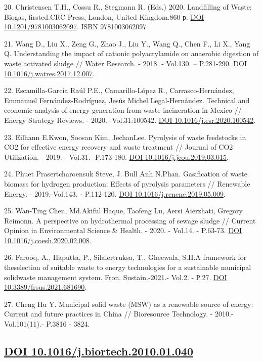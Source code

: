 20. Christensen T.H., Cossu R., Stegmann R. (Eds.) 2020. Landfilling of
Waste: Biogas, firsted.CRC Press, London, United Kingdom.860 р.
\href{https://doi.org/10.1201/9781003062097}{DOI 10.1201/9781003062097}.
ISBN 9781003062097

21. Wang D., Liu X., Zeng G., Zhao J., Liu Y., Wang Q., Chen F., Li X.,
Yang Q. Understanding the impact of cationic polyacrylamide on anaerobic
digestion of waste activated sludge // Water Research. - 2018. -
Vol.130. -- P.281-290.
\href{https://doi.org/10.1016/j.watres.2017.12.007}{DOI
10.1016/j.watres.2017.12.007}.

22. Escamilla-García Raúl P.E., Camarillo-López R., Carrasco-Hernández,
Emmanuel Fernández-Rodríguez, Jesús Michel Legal-Hernández. Technical
and economic analysis of energy generation from waste incineration in
Mexico // Energy Strategy Reviews. - 2020. -Vol.31:100542.
\href{https://doi.org/10.1016/j.esr.2020.100542}{DOI
10.1016/j.esr.2020.100542}.

23. Eilhann E.Kwon, Soosan Kim, JechanLee. Pyrolysis of waste feedstocks
in CO2 for effective energy recovery and waste treatment // Journal of
CO2 Utilization. - 2019. - Vol.31.- P.173-180.
\href{https://doi.org/10.1016/j.jcou.2019.03.015}{DOI
10.1016/j.jcou.2019.03.015}.

24. Phuet Prasertcharoensuk Steve, J. Bull Anh N.Phan. Gasification of
waste biomass for hydrogen production: Effects of pyrolysis parameters
// Renewable Energy. - 2019.-Vol.143. - P.112-120.
\href{https://doi.org/10.1016/j.renene.2019.05.009}{DOI
10.1016/j.renene.2019.05.009}.

25. Wan-Ting Chen, Md.Akiful Haque, Taofeng Lu, Aersi Aierzhati, Gregory
Reimonn. A perspective on hydrothermal processing of sewage sludge //
Current Opinion in Environmental Science \& Health. - 2020. - Vol.14. -
P.63-73. \href{https://doi.org/10.1016/j.coesh.2020.02.008}{DOI
10.1016/j.coesh.2020.02.008}.

26. Farooq, A., Haputta, P., Silalertruksa, T., Gheewala, S.H.A
framework for theselection of suitable waste to energy technologies for
a sustainable municipal solidwaste management system. Fron.
Sustain.-2021.- Vol.2. - Р.27.
\href{https://doi.org/10.3389/frsus.2021.681690}{DOI
10.3389/frsus.2021.681690}.

27. Cheng Hu Y. Municipal solid waste (MSW) as a renewable source of
energy: Current and future practices in China // Bioresource Technology.
- 2010.-Vol.101(11).- P.3816 - 3824.

\subsection{\texorpdfstring{\href{https://doi.org/10.1016/j.biortech.2010.01.040}{DOI
10.1016/j.biortech.2010.01.040}}{DOI 10.1016/j.biortech.2010.01.040}}\label{doi-10.1016j.biortech.2010.01.040-1}

